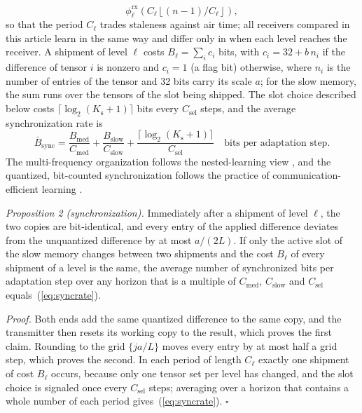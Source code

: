 \begin{equation}
\phi^\mathrm{rx}_\ell\!\left(C_\ell\left\lfloor (n-1)/C_\ell\right\rfloor\right),
\label{eq:stale}
\end{equation}
so that the period $C_\ell$ trades staleness against air time; all receivers compared in this article learn in the same way and differ only in when each level reaches the receiver. A shipment of level $\ell$ costs $B_\ell = \sum_{i} c_i$ bits, with $c_i = 32 + b\,n_i$ if the difference of tensor $i$ is nonzero and $c_i = 1$ (a flag bit) otherwise, where $n_i$ is the number of entries of the tensor and 32 bits carry its scale $a$; for the slow memory, the sum runs over the tensors of the slot being shipped. The slot choice described below costs $\lceil\log_2(K_\mathrm{s}+1)\rceil$ bits every $C_\mathrm{sel}$ steps, and the average synchronization rate is
\begin{equation}
\bar{B}_\mathrm{sync} = \frac{B_\mathrm{med}}{C_\mathrm{med}} + \frac{B_\mathrm{slow}}{C_\mathrm{slow}} + \frac{\lceil\log_2(K_\mathrm{s}+1)\rceil}{C_\mathrm{sel}}\quad\text{bits per adaptation step}.
\label{eq:syncrate}
\end{equation}
The multi-frequency organization follows the nested-learning view \cite{behrouz2025}, and the quantized, bit-counted synchronization follows the practice of communication-efficient learning \cite{alistarh2017,mcmahan2017}.

\emph{Proposition 2 (synchronization).} Immediately after a shipment of level $\ell$, the two copies are bit-identical, and every entry of the applied difference deviates from the unquantized difference by at most $a/(2L)$. If only the active slot of the slow memory changes between two shipments and the cost $B_\ell$ of every shipment of a level is the same, the average number of synchronized bits per adaptation step over any horizon that is a multiple of $C_\mathrm{med}$, $C_\mathrm{slow}$ and $C_\mathrm{sel}$ equals~(\ref{eq:syncrate}).

\emph{Proof.} Both ends add the same quantized difference to the same copy, and the transmitter then resets its working copy to the result, which proves the first claim. Rounding to the grid $\{ja/L\}$ moves every entry by at most half a grid step, which proves the second. In each period of length $C_\ell$ exactly one shipment of cost $B_\ell$ occurs, because only one tensor set per level has changed, and the slot choice is signaled once every $C_\mathrm{sel}$ steps; averaging over a horizon that contains a whole number of each period gives~(\ref{eq:syncrate}). $\square$

